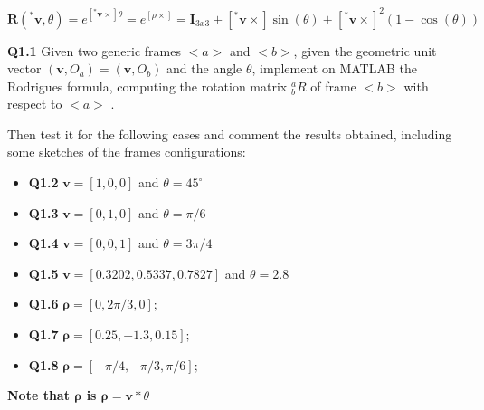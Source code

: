 \[ \textbf{R}(^* \textbf{v},\theta) = e^{[^*\textbf{v}\times]\theta} = e^{[\rho\times]} =  \textbf{I}_{3x3} + [^* \textbf{v}\times] \sin(\theta) + [^* \textbf{v}\times]^2 (1-\cos(\theta))\]

\textbf{Q1.1} Given two generic frames $<a>$ and $<b>$, given the geometric unit vector \begin{math}(\textbf{v},O_a) = (\textbf{v},O_b)\end{math} and the angle $\theta$, implement on MATLAB the Rodrigues formula, computing the rotation matrix $^a_b R$ of frame $<b>$  with respect to $<a>$ .

Then test it for the following cases and comment the results obtained, including some sketches of the frames configurations:
\begin{itemize}
    \item \textbf{Q1.2}\hspace{10mm} \begin{math} \textbf{v} = [1,0,0]\end{math} and  \begin{math} \theta = 45^\circ \end{math}
    \item \textbf{Q1.3}\hspace{10mm} \begin{math} \textbf{v} = [0,1,0]\end{math} and  \begin{math} \theta = \pi/6 \end{math}
    \item \textbf{Q1.4}\hspace{10mm} \begin{math} \textbf{v} = [0,0,1]\end{math} and  \begin{math} \theta = 3\pi/4 \end{math}
    \item \textbf{Q1.5}\hspace{10mm} \begin{math} \textbf{v}  = [0.3202,    0.5337,    0.7827]\end{math} and  \begin{math} \theta = 2.8 \end{math}
    \item \textbf{Q1.6}\hspace{10mm} \begin{math} \bm{\rho} = [0, 2\pi/3, 0];\end{math}
    \item \textbf{Q1.7}\hspace{10mm} \begin{math} \bm{\rho} = [0.25, -1.3, 0.15];\end{math}
    \item \textbf{Q1.8}\hspace{10mm} \begin{math} \bm{\rho} = [-\pi/4, -\pi/3 ,\pi/6];\end{math}
\end{itemize}
\textbf{Note that $\bm{\rho}$ is $\bm{\rho} = \textbf{v}*\theta$}
